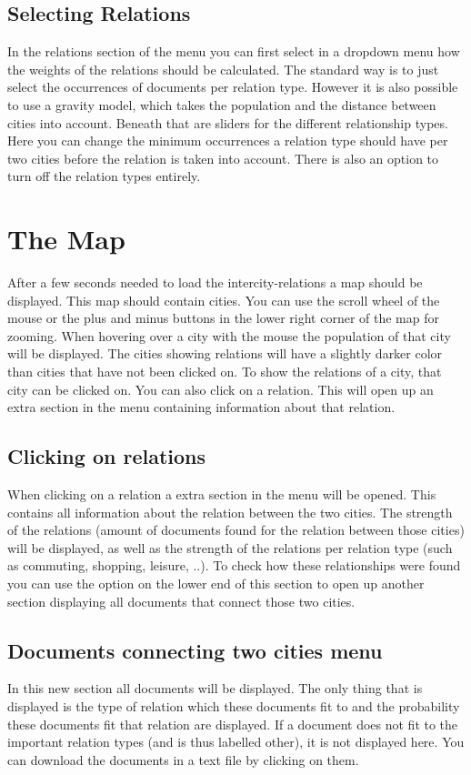 \subsection{Selecting Relations}
In the relations section of the menu you can first select in a dropdown menu how the weights of the relations should be calculated. The standard way is to just select the occurrences of documents per relation type. However it is also possible to use a gravity model, which takes the population and the distance between cities into account.  Beneath that are sliders for the different relationship types. Here you can change the minimum occurrences a relation type should have per two cities before the relation is taken into account. There is also an option to turn off the relation types entirely.


\section{The Map}
After a few seconds needed to load the intercity-relations a map should be displayed. This map should contain cities. You can use the scroll wheel of the mouse or the plus and minus buttons in the lower right corner of the map for zooming. When hovering over a city with the mouse the population of that city will be displayed. The cities showing relations will have a slightly darker color than cities that have not been clicked on. To show the relations of a city, that city can be clicked on. You can also click on a relation. This will open up an extra section in the menu containing information about that relation.

\subsection{Clicking on relations}
When clicking on a relation a extra section in the menu will be opened. This contains all information about the relation between the two cities. The strength of the relations (amount of documents found for the relation between those cities) will be displayed, as well as the strength of the relations per relation type (such as commuting, shopping, leisure, ..). To check how these relationships were found you can use the option on the lower end of this section to open up another section displaying all documents that connect those two cities.

\subsection{Documents connecting two cities menu}
In this new section all documents will be displayed. The only thing that is displayed is the type of relation which these documents fit to and the probability these documents fit that relation are displayed. If a document does not fit to the important relation types (and is thus labelled other), it is not displayed here. You can download the documents in a text file by clicking on them.


